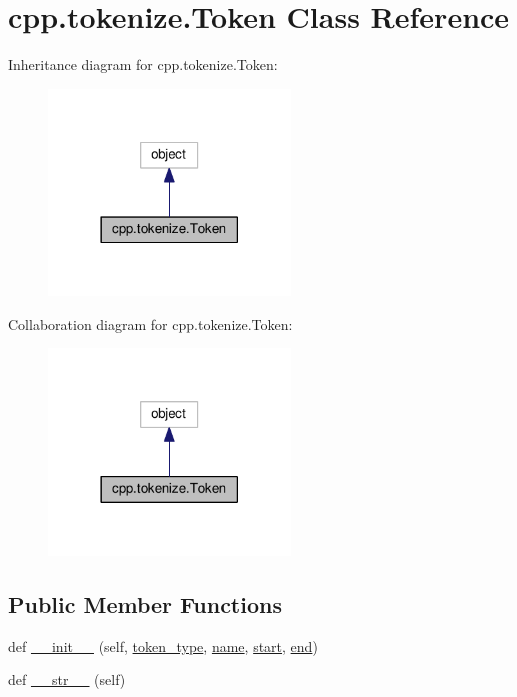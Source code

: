 \hypertarget{classcpp_1_1tokenize_1_1_token}{}\section{cpp.\+tokenize.\+Token Class Reference}
\label{classcpp_1_1tokenize_1_1_token}


Inheritance diagram for cpp.\+tokenize.\+Token\+:
\nopagebreak
\begin{figure}[H]
\begin{center}
\leavevmode
\includegraphics[width=182pt]{classcpp_1_1tokenize_1_1_token__inherit__graph}
\end{center}
\end{figure}


Collaboration diagram for cpp.\+tokenize.\+Token\+:
\nopagebreak
\begin{figure}[H]
\begin{center}
\leavevmode
\includegraphics[width=182pt]{classcpp_1_1tokenize_1_1_token__coll__graph}
\end{center}
\end{figure}
\subsection*{Public Member Functions}
\begin{DoxyCompactItemize}
\item 
def \hyperlink{classcpp_1_1tokenize_1_1_token_a7da7659a5a6c61d0f4b8590cf96e19fd}{\+\_\+\+\_\+init\+\_\+\+\_\+} (self, \hyperlink{classcpp_1_1tokenize_1_1_token_a60c6e5120f3947885f10788ceb69a660}{token\+\_\+type}, \hyperlink{classcpp_1_1tokenize_1_1_token_a90859dd16bde71bc38f717f5119e63b9}{name}, \hyperlink{classcpp_1_1tokenize_1_1_token_a8ec48e348ff29901857cb21553da464b}{start}, \hyperlink{classcpp_1_1tokenize_1_1_token_a9935738c382352eca19834c2533715db}{end})
\item 
def \hyperlink{classcpp_1_1tokenize_1_1_token_a98e024051039637a18601fcbb0232cc2}{\+\_\+\+\_\+str\+\_\+\+\_\+} (self)
\end{DoxyCompactItemize}
